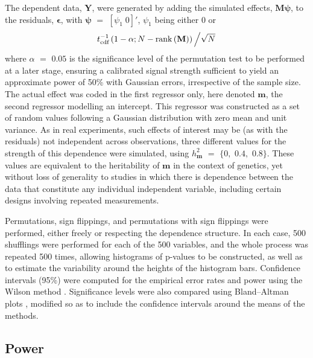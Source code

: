 The dependent data, $\mathbf{Y}$, were generated by adding the simulated effects, $\mathbf{M}\boldsymbol{\psi}$, to the residuals, $\boldsymbol{\epsilon}$, with $\boldsymbol{\psi}$ $=$ $[\psi_1 \; 0]'$, $\psi_1$ being either 0 or
$$t^{-1}_{\text{cdf}}\left(1-\alpha ; N-\mathrm{rank}\left(\mathbf{M}\right)\right)\left/\sqrt{N}\right.$$
where $\alpha$ $=$ $0.05$ is the significance level of the permutation test to be performed at a later stage, ensuring a calibrated signal strength sufficient to yield an approximate power of 50\% with Gaussian errors, irrespective of the sample size. The actual effect was coded in the first regressor only, here denoted $\mathbf{m}$, the second regressor modelling an intercept. This regressor was constructed as a set of random values following a Gaussian distribution with zero mean and unit variance. As in real experiments, such effects of interest may be (as with the residuals) not independent across observations, three different values for the strength of this dependence were simulated, using $h_{\mathbf{m}}^{2}$ $=$ $\{0,$ $0.4,$ $0.8\}$. These values are equivalent to the heritability of $\mathbf{m}$ in the context of genetics, yet without loss of generality to studies in which there is dependence between the data that constitute any individual independent variable, including certain designs involving repeated measurements.

Permutations, sign flippings, and permutations with sign flippings were performed, either freely or respecting the dependence structure. In each case, 500 shufflings were performed for each of the 500 variables, and the whole process was repeated 500 times, allowing histograms of p-values to be constructed, as well as to estimate the variability around the heights of the histogram bars. Confidence intervals (95\%) were computed for the empirical error rates and power using the Wilson method \citep{Wilson1927}. Significance levels were also compared using Bland--Altman plots \citep{Bland1986}, modified so as to include the confidence intervals around the means of the methods.

\subsection{Power}

